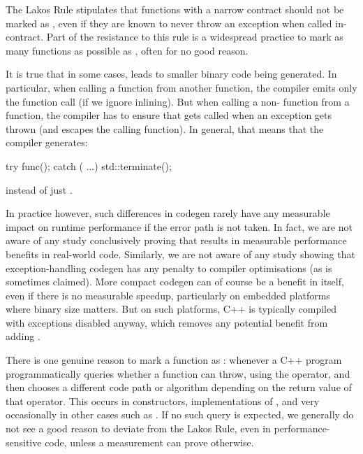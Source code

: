The Lakos Rule stipulates that functions with a narrow contract should not be marked as , even if they are known to never throw an exception when called in-contract. Part of the resistance to this rule is a widespread practice to mark as many functions as possible as , often for no good reason.

It is true that in some cases,  leads to smaller binary code being generated. In particular, when calling a  function from another  function, the compiler emits only the function call (if we ignore inlining). But when calling a non- function from a  function, the compiler has to ensure that  gets called when an exception gets thrown (and escapes the calling function). In general, that means that the compiler generates:
\begin{codeblock}
try { func(); } catch ( ...) { std::terminate(); }
\end{codeblock}
instead of just .

In practice however, such differences in codegen rarely have any measurable impact on runtime performance if the error path is not taken. In fact, we are not aware of any study conclusively proving that  results in measurable performance benefits in real-world code. Similarly, we are not aware of any study showing that exception-handling codegen has any penalty to compiler optimisations (as is sometimes claimed). More compact codegen can of course be a benefit in itself, even if there is no measurable speedup, particularly on embedded platforms where binary size matters. But on such platforms, C++ is typically compiled with exceptions disabled anyway, which removes any potential benefit from adding .

There is one genuine reason to mark a function as : whenever a C++ program programmatically queries whether a function can throw, using the  operator, and then chooses a different code path or algorithm depending on the return value of that operator. This occurs in constructors, implementations of , and very occasionally in other cases such as . If no such query is expected, we generally do not see a good reason to deviate from the Lakos Rule, even in performance-sensitive code, unless a measurement can prove otherwise.

